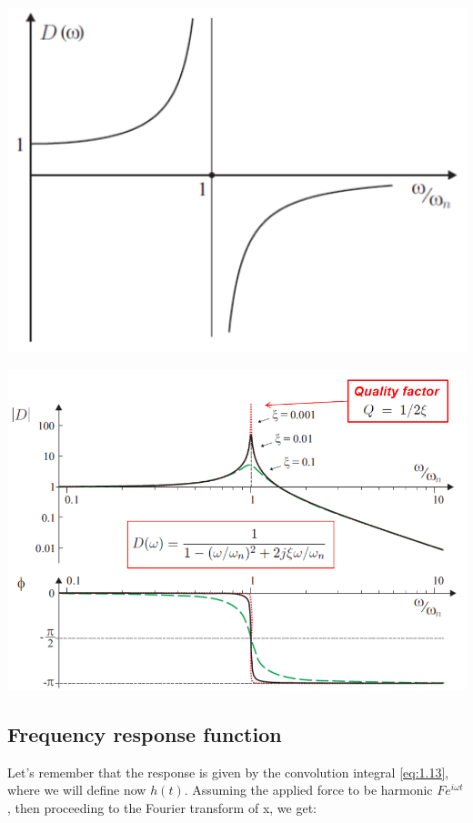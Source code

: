 			\begin{center}
			\begin{minipage}{0.4\textwidth}
			\includegraphics[scale=0.4]{vibration/ch1/9}
			\end{minipage}
			\begin{minipage}{0.4\textwidth}
			\includegraphics[scale=0.24]{vibration/ch1/10}
			\end{minipage}
			\end{center}
			
		\subsection{Frequency response function}
			Let's remember that the response is given by the convolution integral \eqref{eq:1.13}, where we will define now $h(t)$. Assuming the applied force to be harmonic $Fe^{i\omega t}$, then proceeding to the Fourier transform of x, we get:
			

